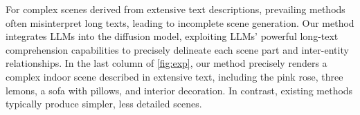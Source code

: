 For complex scenes derived from extensive text descriptions, prevailing methods often misinterpret long texts, leading to incomplete scene generation. Our method integrates LLMs into the diffusion model, exploiting LLMs' powerful long-text comprehension capabilities to precisely delineate each scene part and inter-entity relationships. In the last column of \cref{fig:exp}, our method precisely renders a complex indoor scene described in extensive text, including the pink rose, three lemons, a sofa with pillows, and interior decoration. In contrast, existing methods typically produce simpler, less detailed scenes.

